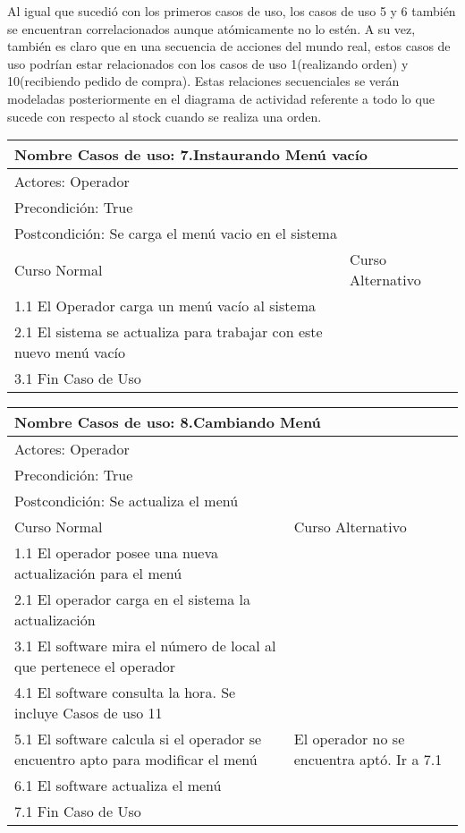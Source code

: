 \documentclass[a4paper,10pt]{article}
\begin{document}
\bigskip
Al igual que sucedi\'o con los primeros casos de uso, los casos de uso 5 y 6 tambi\'en se encuentran correlacionados aunque at\'omicamente no lo est\'en.
A su vez, tambi\'en es claro que en una secuencia de acciones del mundo real, estos casos de uso podr\'ian estar relacionados con los casos
de uso 1(realizando orden) y 10(recibiendo pedido de compra). Estas relaciones secuenciales se ver\'an modeladas posteriormente en el diagrama de actividad
referente a todo lo que sucede con respecto al stock cuando se realiza una orden.

\bigskip


\begin{center}
\begin{tabularx}{14cm}{|X|X|}
\hline
\multicolumn{2}{|l|}{Nombre Casos de uso: 7.Instaurando Men\'u vac\'io}\\
\hline
\multicolumn{2}{|l|}{Actores: Operador}\\
\hline
\multicolumn{2}{|l|}{Precondici\'on: True}\\
\hline
\multicolumn{2}{|l|}{Postcondici\'on: Se carga el men\'u vacio en el sistema}\\
\hline
Curso Normal & Curso Alternativo\\
\hline
1.1 El Operador carga un men\'u vac\'io al sistema & 
\\
\hline
2.1 El sistema se actualiza para trabajar con este nuevo men\'u vac\'io & 
\\
\hline
3.1 Fin Caso de Uso &
\\
\hline
\end{tabularx}
\end{center}

\bigskip

\begin{center}
\begin{tabularx}{14cm}{|X|X|}
\hline
\multicolumn{2}{|l|}{Nombre Casos de uso: 8.Cambiando Men\'u}\\
\hline
\multicolumn{2}{|l|}{Actores: Operador}\\
\hline
\multicolumn{2}{|l|}{Precondici\'on: True}\\
\hline
\multicolumn{2}{|l|}{Postcondici\'on: Se actualiza el men\'u}\\
\hline
Curso Normal & Curso Alternativo\\
\hline
1.1 El operador posee una nueva actualizaci\'on para el men\'u & 
\\
\hline
2.1 El operador carga en el sistema la actualizaci\'on & 
\\
\hline
3.1 El software mira el n\'umero de local al que pertenece el operador &
\\
\hline
4.1 El software consulta la hora. Se incluye Casos de uso 11 &
\\
\hline
5.1 El software calcula si el operador se encuentro apto para modificar el men\'u & El operador no se encuentra apt\'o. Ir a 7.1
\\
\hline
6.1 El software actualiza el men\'u &
\\
\hline
7.1 Fin Caso de Uso &
\\
\hline
\end{tabularx}
\end{center}
\end{document}
